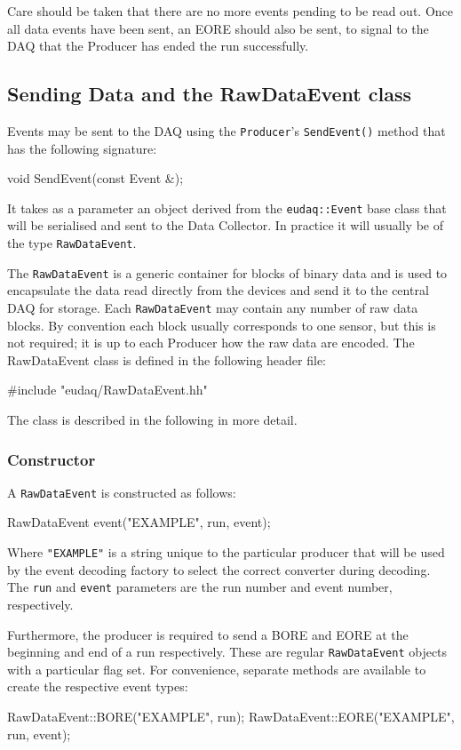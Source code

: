 Care should be taken that there are no more events pending to be read out.
Once all data events have been sent, an \gls{EORE} should also be sent,
to signal to the DAQ that the Producer has ended the run successfully.

\subsection{Sending Data and the RawDataEvent class}
Events may be sent to the DAQ using the \texttt{Producer}'s \texttt{SendEvent()} method
that has the following signature:
\begin{listing}
void SendEvent(const Event &);
\end{listing}

It takes as a parameter an object derived from the \texttt{eudaq::Event} base class
that will be serialised and sent to the Data Collector.
In practice it will usually be of the type \texttt{RawDataEvent}.

The \texttt{RawDataEvent} is a generic container for blocks of binary data and is used to encapsulate the data read directly from the devices and send it to the central DAQ for storage.
Each \texttt{RawDataEvent} may contain any number of raw data blocks.
By convention each block usually corresponds to one sensor,
but this is not required;
it is up to each Producer how the raw data are encoded.
The RawDataEvent class is defined in the following header file:
\begin{listing}
#include "eudaq/RawDataEvent.hh"
\end{listing}

The class is described in the following in more detail.

\subsubsection{Constructor}
A \texttt{RawDataEvent} is constructed as follows:
\begin{listing}
RawDataEvent event("EXAMPLE", run, event);
\end{listing}

Where \texttt{"EXAMPLE"} is a string unique to the particular producer
that will be used by the event decoding factory to select the correct converter during decoding.
The \texttt{run} and \texttt{event} parameters are the run number
and event number, respectively.

Furthermore, the producer is required to send a \gls{BORE}
and \gls{EORE} at the beginning and end of a run respectively.
These are regular \texttt{RawDataEvent} objects with a particular flag set.
For convenience, separate methods are available to create the respective event types:
\begin{listing}
RawDataEvent::BORE("EXAMPLE", run);
RawDataEvent::EORE("EXAMPLE", run, event);
\end{listing}

